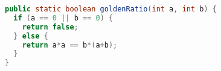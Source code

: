 \begin{lstlisting}[language=Java]
public static boolean goldenRatio(int a, int b) {
  if (a == 0 || b == 0) {
    return false;
  } else {
    return a*a == b*(a+b);
  }
}
\end{lstlisting}